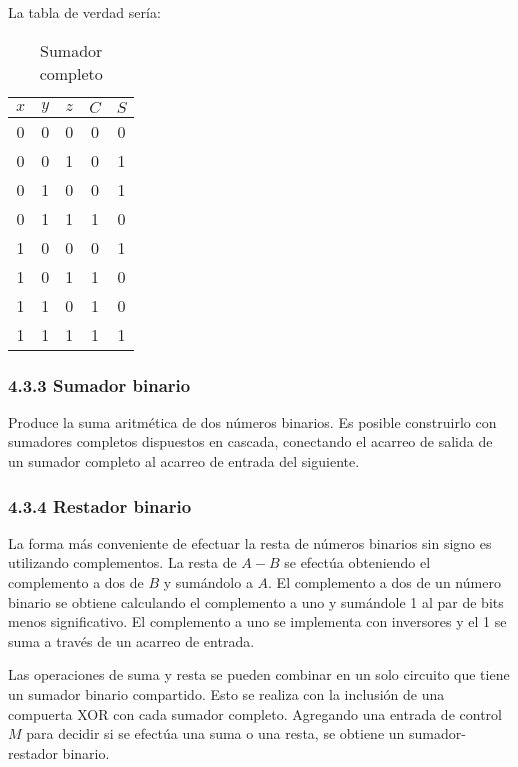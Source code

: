 \begin{flushleft}
    La tabla de verdad ser\'{i}a:
\end{flushleft}

\begin{table}[h]
    \centering
    \begin{tabular}{ccc|cc}
        \toprule
        $x$ & $y$ & $z$ & $C$ & $S$ \\
        \midrule
        0   & 0   & 0   & 0   & 0   \\
        0   & 0   & 1   & 0   & 1   \\
        0   & 1   & 0   & 0   & 1   \\
        0   & 1   & 1   & 1   & 0   \\
        1   & 0   & 0   & 0   & 1   \\
        1   & 0   & 1   & 1   & 0   \\
        1   & 1   & 0   & 1   & 0   \\
        1   & 1   & 1   & 1   & 1   \\
        \bottomrule
    \end{tabular}
    \caption{Sumador completo}
\end{table}

\newpage
\subsubsection*{4.3.3 Sumador binario}
Produce la suma aritm\'{e}tica de dos n\'{u}meros binarios. Es posible construirlo con
sumadores completos dispuestos en cascada, conectando el acarreo de salida de un sumador
completo al acarreo de entrada del siguiente.

\subsubsection*{4.3.4 Restador binario}
La forma m\'{a}s conveniente de efectuar la resta de n\'{u}meros binarios sin signo es
utilizando complementos. La resta de $A - B$ se efect\'{u}a obteniendo el complemento
a dos de $B$ y sum\'{a}ndolo a $A$. El complemento a dos de un n\'{u}mero binario se
obtiene calculando el complemento a uno y sum\'{a}ndole 1 al par de bits menos significativo.
El complemento a uno se implementa con inversores y el 1 se suma a trav\'{e}s de un acarreo
de entrada.

Las operaciones de suma y resta se pueden combinar en un solo circuito que tiene un sumador
binario compartido. Esto se realiza con la inclusi\'{o}n de una compuerta XOR con cada sumador
completo. Agregando una entrada de control $M$ para decidir si se efect\'{u}a una suma o una
resta, se obtiene un sumador-restador binario.

